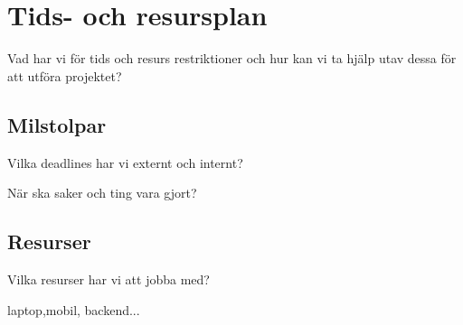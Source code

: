 \section{Tids- och resursplan}
Vad har vi för tids och resurs restriktioner och hur kan vi ta hjälp utav dessa för att utföra 
projektet?

\subsection{Milstolpar}
Vilka deadlines har vi externt och internt?

När ska saker och ting vara gjort?
\subsection{Resurser}
Vilka resurser har vi att jobba med?

laptop,mobil, backend...


